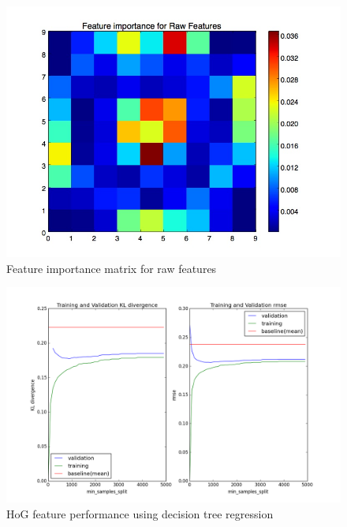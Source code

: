 \documentclass[10pt]{article}
\begin{document}
\begin{figure}
\begin{center}
\includegraphics[scale=0.4]{images/Raw_Features_DT_Heatmap.jpg}
\caption{Feature importance matrix for raw features}
\label{fig:rawdtheat}
\end{center}
\end{figure}

\begin{figure}
\begin{center}
\includegraphics[scale=0.4]{images/HoG_DecisionTreeCV.png}
\caption{HoG feature performance using decision tree regression}
\label{fig:hogdreval}
\end{center}
\end{figure}
\end{document}
